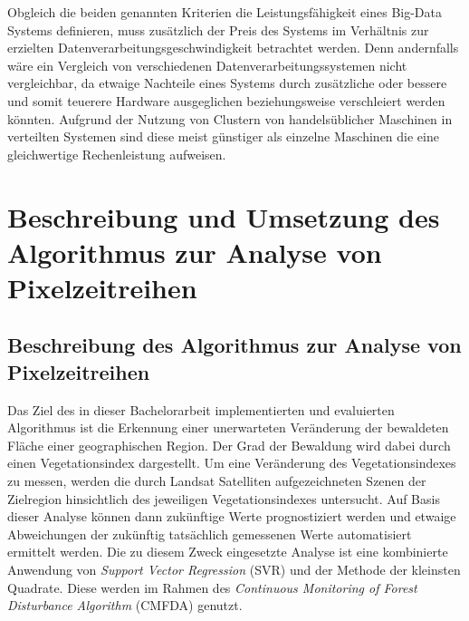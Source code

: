 Obgleich die beiden genannten Kriterien die Leistungsfähigkeit eines Big-Data Systems definieren, muss zusätzlich der Preis des Systems im Verhältnis zur erzielten Datenverarbeitungsgeschwindigkeit betrachtet werden. Denn andernfalls wäre ein Vergleich von verschiedenen Datenverarbeitungssystemen nicht vergleichbar, da etwaige Nachteile eines Systems durch zusätzliche oder bessere und somit teuerere Hardware ausgeglichen beziehungsweise verschleiert werden könnten. Aufgrund der Nutzung von Clustern von handelsüblicher Maschinen in verteilten Systemen sind diese meist günstiger als einzelne Maschinen die eine gleichwertige Rechenleistung aufweisen.


\chapter[Algorithmus zur Analyse von Pixelzeitreihen]{Beschreibung und Umsetzung des Algorithmus zur Analyse von Pixelzeitreihen}
\label{cha:AlgorithmForSatellitePictureAnalysis}
\section[Beschreibung des Algorithmus]{Beschreibung des Algorithmus zur Analyse von Pixelzeitreihen}
\label{sec:DescriptionOfTheAlgorithm}
Das Ziel des in dieser Bachelorarbeit implementierten und evaluierten Algorithmus ist die Erkennung einer unerwarteten Veränderung der bewaldeten Fläche einer geographischen Region. Der Grad der Bewaldung wird dabei durch einen Vegetationsindex dargestellt. Um eine Veränderung des Vegetationsindexes zu messen, werden die durch Landsat Satelliten aufgezeichneten Szenen der Zielregion hinsichtlich des jeweiligen Vegetationsindexes untersucht. Auf Basis dieser Analyse können dann zukünftige Werte prognostiziert werden und etwaige Abweichungen der zukünftig tatsächlich gemessenen Werte automatisiert ermittelt werden. Die zu diesem Zweck eingesetzte Analyse ist eine kombinierte Anwendung von \textit{Support Vector Regression} (SVR) \cite{Basak2007} und der Methode der kleinsten Quadrate. Diese werden im Rahmen des \textit{Continuous Monitoring of Forest Disturbance Algorithm} (CMFDA) \cite{Zhu2012} genutzt. %

